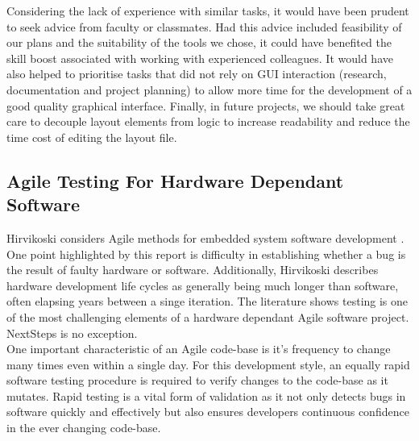 \documentclass{l3proj}
\begin{document}
Considering the lack of experience with similar tasks, it would have been prudent to seek advice from faculty or classmates. Had this advice included feasibility of our plans and the suitability of the tools we chose, it could have benefited the skill boost associated with working with experienced colleagues\cite{panwong}. It would have also helped to prioritise tasks that did not rely on GUI interaction (research, documentation and project planning) to allow more time for the development of a good quality graphical interface. Finally, in future projects, we should take great care to decouple layout elements from logic to increase readability and reduce the time cost of editing the layout file.

\subsection{Agile Testing For Hardware Dependant Software}
Hirvikoski considers Agile methods for embedded system software development \cite{hirvikoski}. One point highlighted by this report is difficulty in establishing whether a bug is the result of faulty hardware or software. Additionally, Hirvikoski describes hardware development life cycles as generally being much longer than software, often elapsing years between a singe iteration. The literature shows testing is one of the most challenging elements of a hardware dependant Agile software project. NextSteps is no exception. 
\\One important characteristic of an Agile code-base is it's frequency to change many times even within a single day.
 For this development style, an equally rapid software testing procedure is required to verify changes to the code-base as it mutates. 
 Rapid testing is a vital form of validation as it not only detects bugs in software quickly and effectively but also ensures developers continuous confidence in the ever changing code-base.
\end{document}

